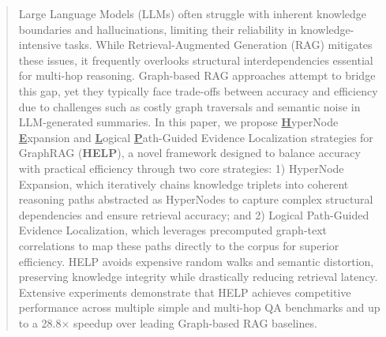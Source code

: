 \documentclass{article}
\theoremstyle{plain}
\theoremstyle{definition}
\theoremstyle{remark}
\begin{document}
\begin{abstract}
Large Language Models (LLMs) often struggle with inherent knowledge boundaries and hallucinations, limiting their reliability in knowledge-intensive tasks. While Retrieval-Augmented Generation (RAG) mitigates these issues, it frequently overlooks structural interdependencies essential for multi-hop reasoning. Graph-based RAG approaches attempt to bridge this gap, yet they typically face trade-offs between accuracy and efficiency due to challenges such as costly graph traversals and semantic noise in LLM-generated summaries. In this paper, we propose \underline{\textbf{H}}yperNode \underline{\textbf{E}}xpansion and \underline{\textbf{L}}ogical \underline{\textbf{P}}ath-Guided Evidence Localization strategies for GraphRAG (\textbf{HELP}), a novel framework designed to balance accuracy with practical efficiency through two core strategies: 1) HyperNode Expansion, which iteratively chains knowledge triplets into coherent reasoning paths abstracted as HyperNodes to capture complex structural dependencies and ensure retrieval accuracy;
and 2) Logical Path-Guided Evidence Localization, which leverages precomputed graph-text correlations to map these paths directly to the corpus for superior efficiency. HELP avoids expensive random walks and semantic distortion, preserving knowledge integrity while drastically reducing retrieval latency. Extensive experiments demonstrate that HELP achieves competitive performance across multiple simple and multi-hop QA benchmarks and up to a 28.8$\times$ speedup over leading Graph-based RAG baselines.

\end{abstract}












\end{document}
